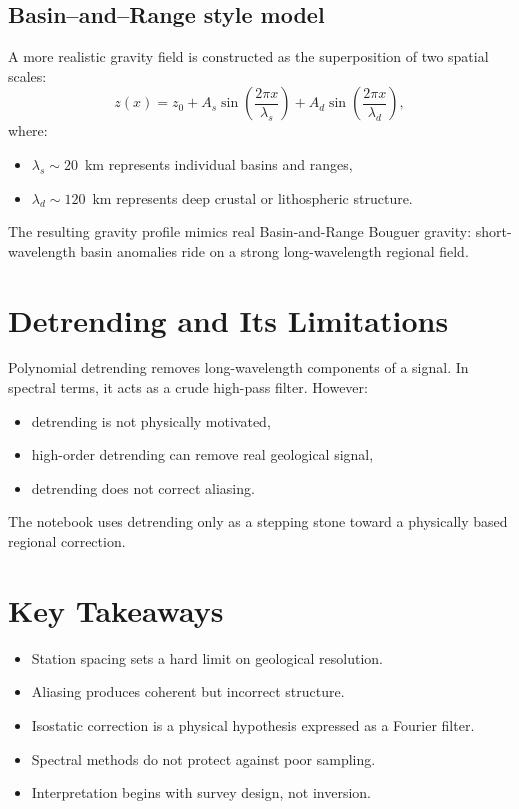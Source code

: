 \documentclass[11pt,a4paper]{article}
\begin{document}
\subsection{Basin--and--Range style model}

A more realistic gravity field is constructed as the superposition of
two spatial scales:
\begin{equation}
z(x) = z_0
+ A_s \sin\!\left(\frac{2\pi x}{\lambda_s}\right)
+ A_d \sin\!\left(\frac{2\pi x}{\lambda_d}\right),
\end{equation}
where:
\begin{itemize}
  \item $\lambda_s \sim 20$~km represents individual basins and ranges,
  \item $\lambda_d \sim 120$~km represents deep crustal or lithospheric structure.
\end{itemize}

The resulting gravity profile mimics real Basin-and-Range Bouguer gravity:
short-wavelength basin anomalies ride on a strong long-wavelength regional field.

\section{Detrending and Its Limitations}

Polynomial detrending removes long-wavelength components of a signal.
In spectral terms, it acts as a crude high-pass filter.
However:
\begin{itemize}
  \item detrending is not physically motivated,
  \item high-order detrending can remove real geological signal,
  \item detrending does not correct aliasing.
\end{itemize}

The notebook uses detrending only as a stepping stone toward a physically based
regional correction.


\section{Key Takeaways}

\begin{itemize}
  \item Station spacing sets a hard limit on geological resolution.
  \item Aliasing produces coherent but incorrect structure.
  \item Isostatic correction is a physical hypothesis expressed as a Fourier filter.
  \item Spectral methods do not protect against poor sampling.
  \item Interpretation begins with survey design, not inversion.
\end{itemize}
\end{document}
